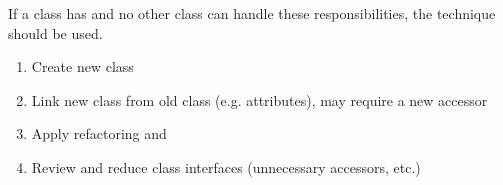 \documentclass[
../../Software_Engineering_Summary.tex,
]
{subfiles}
\begin{document}
If a class has  and no other class can handle these responsibilities, the  technique should be used.

\begin{defbox}
    \begin{enumerate}
        \item Create new class
        \item Link new class from old class (e.g. attributes), may require a new accessor
        \item Apply refactoring  and 
        \item Review and reduce class interfaces (unnecessary accessors, etc.)
    \end{enumerate}
\end{defbox}
\end{document}
